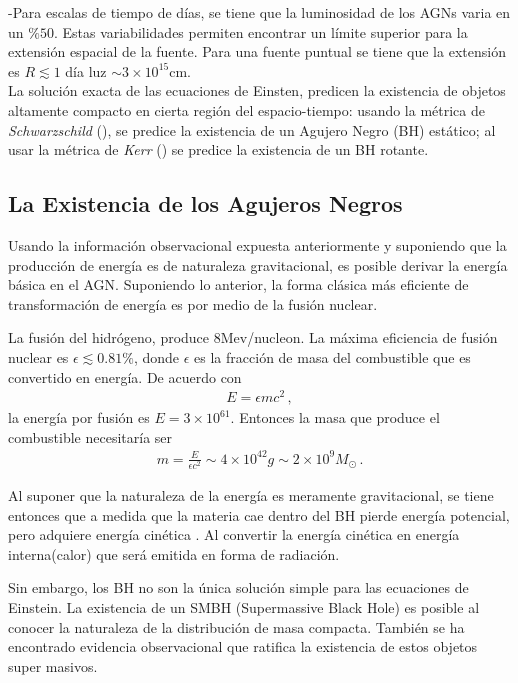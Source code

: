 -Para escalas de tiempo de días, se tiene que la luminosidad de los AGNs varia en un $\% 50$. Estas variabilidades permiten encontrar un límite superior para la extensión espacial de la fuente. Para una fuente puntual se tiene que la extensión es $R \lesssim 1$ día luz $\sim3\times10^{15}$cm.\\

La solución exacta de las ecuaciones de Einsten, predicen la existencia de objetos altamente compacto en cierta región del espacio-tiempo: usando la métrica de {\it{Schwarzschild}} (), se predice la existencia de un Agujero Negro (BH) estático; al usar la métrica de {\it{Kerr}} () se predice la existencia de un BH rotante. 

	\subsection{La Existencia de los Agujeros Negros}
	\label{subsec:Why_a_BH}

Usando la información observacional expuesta anteriormente y suponiendo que la producción de energía es de naturaleza gravitacional, es posible derivar la energía básica en el AGN. Suponiendo lo anterior, la forma clásica más eficiente de transformación de energía es por medio de la fusión nuclear. 

La fusión del hidrógeno, produce 8Mev/nucleon. La máxima eficiencia de fusión nuclear es $\epsilon \lesssim 0.81 \%$, donde $\epsilon$ es la fracción de masa del combustible que es convertido en energía. De acuerdo con 
\begin{align}
E=\epsilon mc^{2}\,,
\end{align}
%
la energía por fusión es $E=3\times10^{61}$. Entonces la masa que produce el combustible necesitaría ser 
\begin{align}
m=\frac{E}{\epsilon c^{2}} \sim 4\times10^{42}g\sim 2\times10^{9}M_{\odot}\,.
\end{align}

Al suponer que la naturaleza de la energía es meramente gravitacional, se tiene entonces que a medida que la materia cae dentro del BH pierde energía potencial, pero adquiere energía cinética . Al convertir la energía cinética en energía interna(calor) que será emitida en forma de radiación.

Sin embargo, los BH no son la única solución simple para las ecuaciones de Einstein. La existencia de un SMBH (Supermassive Black Hole) es posible al conocer la naturaleza de la distribución de masa compacta. También se ha encontrado evidencia observacional que ratifica la existencia de estos objetos super masivos. 

